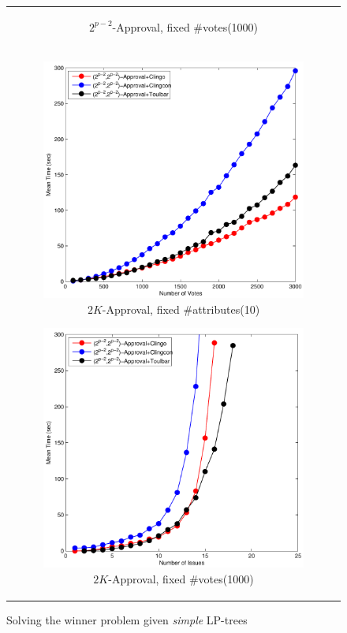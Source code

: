 \begin{figure}[ht!]
\begin{tabular}{c}
\begin{subfigure}[b]{0.44\textwidth}
		\captionsetup{font=scriptsize}
    \caption{$2^{p-2}$-Approval, fixed \#votes(1000)}
		\label{fig:comparison:win:4}
	\end{subfigure}
  \\
  \begin{subfigure}[b]{0.44\textwidth}
		\includegraphics[width=\textwidth]{figs/2kAppFIMSCICP.pdf}
		\captionsetup{font=scriptsize}
    \caption{$2K$-Approval, fixed \#attributes(10)}
		\label{fig:comparison:win:5}
	\end{subfigure}
  \begin{subfigure}[b]{0.44\textwidth}
		\includegraphics[width=\textwidth]{figs/2kAppFVMSCICP.pdf}
		\captionsetup{font=scriptsize}
    \caption{$2K$-Approval, fixed \#votes(1000)}
		\label{fig:comparison:win:6}
	\end{subfigure}
	\end{tabular}
  \caption{Solving the winner problem given \textit{simple} LP-trees}
  \label{fig:win}


\end{figure}
